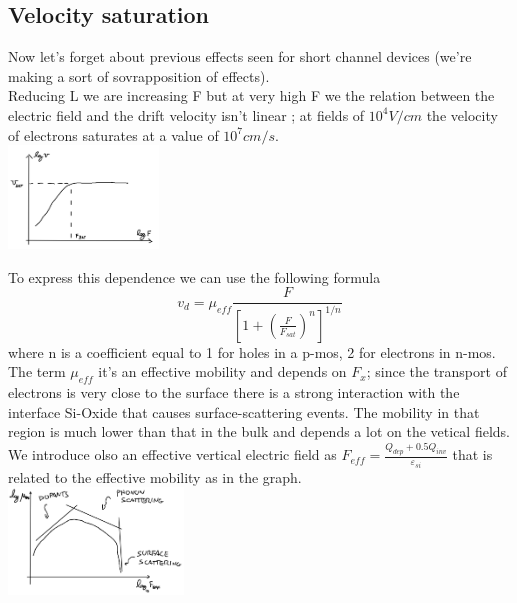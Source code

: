 \subsection{Velocity saturation}
Now let's forget about previous effects seen for short channel devices (we're making a sort of sovrapposition of effects).\\
Reducing L we are increasing F but at very high F we the relation between the electric field and the drift velocity isn't linear ; at fields of $10^4 V/cm$ the velocity of electrons saturates at a value of $10^7 cm/s$.\\

\centering
\includegraphics[width=0.3\textwidth]{satvel.png}\\
\raggedright

To express this dependence we can use the following formula 
\begin{equation}
v_d=\mu_{eff}\frac{F}{[1+\left(\frac{F}{F_{sat}}\right)^n]^{1/n}}
\end{equation}
where n is a coefficient equal to 1 for holes in a p-mos, 2 for electrons in n-mos.\\ 
The term $\mu_{eff}$ it's an effective mobility and depends on $F_x$; since the transport of electrons is very close to the surface there is a strong interaction with the interface Si-Oxide that causes surface-scattering events. The mobility in that region is much lower than that in the bulk and depends a lot on the vetical fields. We introduce olso an effective vertical electric field as $F_{eff}=\frac{Q_{dep}+0.5Q_{inv}}{\varepsilon_{si}}$ that is related to the effective mobility as in the graph.\\

\centering
\includegraphics[width=0.35\textwidth]{muefff.png}\\
\raggedright

